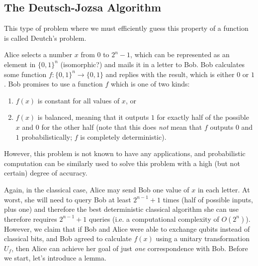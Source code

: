 \documentclass{article}
\begin{document}
  \subsection{The Deutsch-Jozsa Algorithm}

    This type of problem where we must efficiently guess this property of a function is called Deutch's problem. 

    \begin{definition}
      Alice selects a number $x$ from $0$ to $2^n - 1$, which can be represented as an element in $\{0, 1\}^n$ (isomorphic?) and mails it in a letter to Bob. Bob calculates some function $f: \{0, 1\}^n \longrightarrow \{0, 1\}$ and replies with the result, which is either $0$ or $1$. Bob promises to use a function $f$ which is one of two kinds: 
      \begin{enumerate}
        \item $f(x)$ is constant for all values of $x$, or
        \item $f(x)$ is balanced, meaning that it outputs $1$ for exactly half of the possible $x$ and $0$ for the other half (note that this does \textit{not} mean that $f$ outputs $0$ and $1$ probabilistically; $f$ is completely deterministic). 
      \end{enumerate}
    \end{definition}

    However, this problem is not known to have any applications, and probabilistic computation can be similarly used to solve this problem with a high (but not certain) degree of accuracy. 

    Again, in the classical case, Alice may send Bob one value of $x$ in each letter. At worst, she will need to query Bob at least $2^{n-1} + 1$ times (half of possible inputs, plus one) and therefore the best deterministic classical algorithm she can use therefore requires $2^{n-1} + 1$ queries (i.e. a computational complexity of $O(2^n)$). However, we claim that if Bob and Alice were able to exchange qubits instead of classical bits, and Bob agreed to calculate $f(x)$ using a unitary transformation $U_f$, then Alice can achieve her goal of just \textit{one} correspondence with Bob. Before we start, let's introduce a lemma. 
\end{document}
